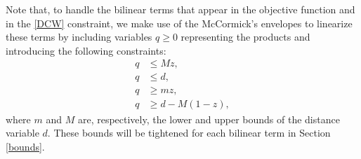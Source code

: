 \documentclass{itor}
\theoremstyle{definition}
\theoremstyle{remark}
\begin{document}


Note that, to handle the bilinear terms that appear in the objective function and in the \eqref{DCW} constraint, we make use of the McCormick's envelopes to linearize these terms by including variables $q\geq 0$  representing the products and introducing the following constraints:
\begin{align*}
    q & \leq  M z, \\
    q & \leq  d, \\
    q & \geq m z, \\
    q & \geq d - M(1 - z),
\end{align*}
where $m$ and $M$ are, respectively, the lower and upper bounds of the distance variable $d$. These bounds will be tightened for each bilinear term in Section \ref{bounds}.
\end{document}
